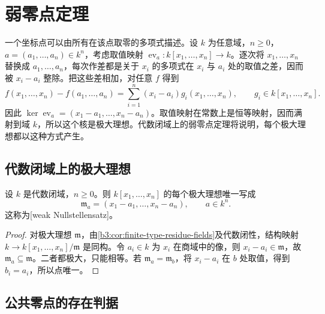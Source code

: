 
\section{弱零点定理}\label{b3:sec:0602}

一个坐标点可以由所有在该点取零的多项式描述。设 \(k\) 为任意域，\(n\ge0\)，\(a=(a_1,\ldots,a_n)\in k^n\)，考虑取值映射 \(\operatorname{ev}_a:k[x_1,\ldots,x_n]\to k\)。逐次将 \(x_1,\ldots,x_n\) 替换成 \(a_1,\ldots,a_n\)，每次作差都是关于 \(x_i\) 的多项式在 \(x_i\) 与 \(a_i\) 处的取值之差，因而被 \(x_i-a_i\) 整除。把这些差相加，对任意 \(f\) 得到
\[
	f(x_1,\ldots,x_n)-f(a_1,\ldots,a_n) =\sum_{i=1}^n(x_i-a_i)g_i(x_1,\ldots,x_n), \qquad g_i\in k[x_1,\ldots,x_n].
\]
因此 \(\ker\operatorname{ev}_a=(x_1-a_1,\ldots,x_n-a_n)\)。取值映射在常数上是恒等映射，因而满射到域 \(k\)，所以这个核是极大理想。代数闭域上的弱零点定理将说明，每个极大理想都以这种方式产生。

\subsection{代数闭域上的极大理想}\label{b3:subsec:0602:01}

\begin{theorem}\label{b3:thm:weak-nullstellensatz}
	设 \(k\) 是代数闭域，\(n\ge0\)。则 \(k[x_1,\ldots,x_n]\) 的每个极大理想唯一写成
	\[
		\mathfrak m_a=(x_1-a_1,\ldots,x_n-a_n),\qquad a\in k^n.
	\]
	这称为[weak Nullstellensatz]。
\end{theorem}
\begin{proof}
	对极大理想 \(\mathfrak m\)，由\cref{b3:cor:finite-type-residue-fields}及代数闭性，结构映射 \(k\to k[x_1,\ldots,x_n]/\mathfrak m\) 是同构。令 \(a_i\in k\) 为 \(x_i\) 在商域中的像，则 \(x_i-a_i\in\mathfrak m\)，故 \(\mathfrak m_a\subseteq\mathfrak m\)。二者都极大，只能相等。若 \(\mathfrak m_a=\mathfrak m_b\)，将 \(x_i-a_i\) 在 \(b\) 处取值，得到 \(b_i=a_i\)，所以点唯一。
\end{proof}

\subsection{公共零点的存在判据}\label{b3:subsec:0602:02}

